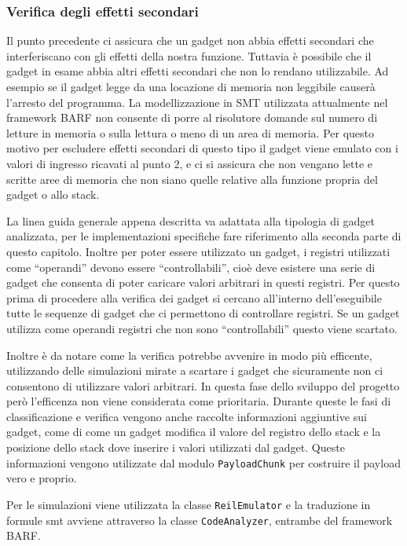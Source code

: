 \subsubsection{Verifica degli effetti secondari}  

Il punto precedente ci assicura che un gadget non abbia effetti
secondari che interferiscano con gli effetti della nostra
funzione. Tuttavia è possibile che il gadget in esame abbia altri
effetti secondari che non lo rendano utilizzabile. Ad esempio se il
gadget legge da una locazione di memoria non leggibile causerà
l'arresto del programma. La modellizzazione in SMT utilizzata
attualmente nel framework BARF non consente di porre al risolutore
domande sul numero di letture in memoria o sulla lettura o meno di
un area di memoria. Per questo motivo per escludere effetti
secondari di questo tipo il gadget viene emulato con i valori di
ingresso ricavati al punto 2, e ci si assicura che non vengano lette
e scritte aree di memoria che non siano quelle relative alla
funzione propria del gadget o allo stack.


La linea guida generale appena descritta va adattata alla tipologia di
gadget analizzata, per le implementazioni specifiche fare riferimento
alla seconda parte di questo capitolo. Inoltre per poter essere
utilizzato un gadget, i registri utilizzati come ``operandi'' devono
essere ``controllabili'', cioè deve esistere una serie di gadget che
consenta di poter caricare valori arbitrari in questi registri. Per
questo prima di procedere alla verifica dei gadget si cercano
all'interno dell'eseguibile tutte le sequenze di gadget che ci
permettono di controllare registri. Se un gadget utilizza come
operandi registri che non sono ``controllabili'' questo viene
scartato.

Inoltre è da notare come la verifica potrebbe avvenire in modo più
efficente, utilizzando delle simulazioni mirate a scartare i gadget
che sicuramente non ci consentono di utilizzare valori arbitrari. In
questa fase dello sviluppo del progetto però l'efficenza non viene
considerata come prioritaria.  Durante queste le fasi di
classificazione e verifica vengono anche raccolte informazioni
aggiuntive sui gadget, come di come un gadget modifica il valore del
registro dello stack e la posizione dello stack dove inserire i valori
utilizzati dal gadget. Queste informazioni vengono utilizzate dal
modulo \lstinline{PayloadChunk} per costruire il payload vero e proprio.


Per le simulazioni viene utilizzata la classe \lstinline{ReilEmulator}
e la traduzione in formule smt avviene attraverso la classe
\lstinline{CodeAnalyzer}, entrambe del framework BARF.



